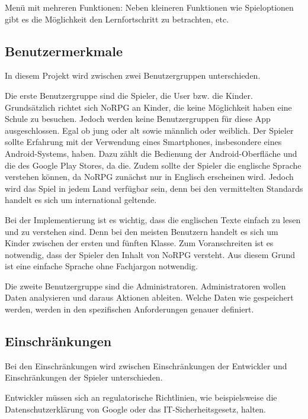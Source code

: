 		Menü mit mehreren Funktionen: Neben kleineren Funktionen wie Spieloptionen gibt es die Möglichkeit den Lernfortschritt zu betrachten, etc.
		
	
	\subsection{Benutzermerkmale}
		In diesem Projekt wird zwischen zwei Benutzergruppen unterschieden.
		
		Die erste Benutzergruppe sind die Spieler, die User bzw. die Kinder. Grundsätzlich richtet sich NoRPG an Kinder, die keine Möglichkeit haben eine Schule zu besuchen. Jedoch werden keine Benutzergruppen für diese App ausgeschlossen. Egal ob jung oder alt sowie männlich oder weiblich. %
		Der Spieler sollte Erfahrung mit der Verwendung eines Smartphones, insbesondere eines Android-Systems, haben. Dazu zählt die Bedienung der Android-Oberfläche und die des Google Play Stores, da die. Zudem sollte der Spieler die englische Sprache verstehen können, da NoRPG zunächst nur in Englisch erscheinen wird. Jedoch wird das Spiel in jedem Land verfügbar sein, denn bei den vermittelten Standards handelt es sich um international geltende.
		
		Bei der Implementierung ist es wichtig, dass die englischen Texte einfach zu lesen und zu verstehen sind. Denn bei den meisten Benutzern handelt es sich um Kinder zwischen der ersten und fünften Klasse. Zum Voranschreiten ist es notwendig, dass der Spieler den Inhalt von NoRPG versteht. Aus diesem Grund ist eine einfache Sprache ohne Fachjargon notwendig.
		
		Die zweite Benutzergruppe sind die Administratoren.	Administratoren wollen Daten analysieren und daraus Aktionen ableiten. Welche Daten wie gespeichert werden, werden in den spezifischen Anforderungen genauer definiert. 
			
	\subsection{Einschränkungen}
		Bei den Einschränkungen wird zwischen Einschränkungen der Entwickler und Einschränkungen der Spieler unterschieden.
		
		Entwickler müssen sich an regulatorische Richtlinien, wie beispielsweise die Datenschutzerklärung von Google oder das IT-Sicherheitsgesetz, halten.
				
